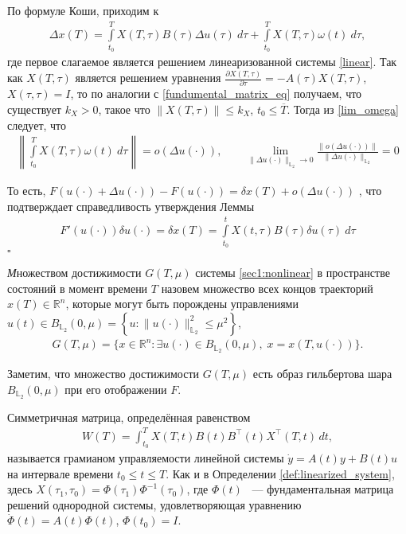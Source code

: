 \documentclass[../main.tex]{subfiles}
\begin{document}
	По формуле Коши, приходим к 
	\begin{gather*}
		\Delta x(T) = \int\limits_{t_0}^{T} X(T, \tau) B(\tau) \Delta u(\tau) \ d\tau + \int\limits_{t_0}^{T}  X(T, \tau) \omega(t) \ d\tau,
	\end{gather*}
	где первое слагаемое является решением линеаризованной системы \eqref{linear}.
	Так как $X(T, \tau) $ является решением уравнения $\frac{\partial X(T, \tau) }{\partial \tau} = -A(\tau)X(T, \tau)$, $X(\tau, \tau) = I$, то по аналогии с \eqref{fundumental_matrix_eq}  получаем, что существует $k_X > 0$, такое что $\|X(T, \tau) \| \leqslant k_X$, $t_0 \leqslant \overline{T} $. Тогда из \eqref{lim_omega} следует, что 
	\begin{gather*}
		\left\|\int\limits_{t_0}^{T}  X(T, \tau) \omega(t) \ d\tau  \right\| = o(\Delta u(\cdot)), \qquad \lim\limits_{\|\Delta u(\cdot) \|_{\mathbb{L}_2} \to 0}  \frac{ \| o(\Delta u(\cdot)) \| }{\|\Delta u(\cdot) \|_{\mathbb{L}_2}}  = 0
	\end{gather*}
	
	То есть, $F(u(\cdot) + \Delta u(\cdot)) - F(u(\cdot)) = \delta x(T) + o(\Delta u(\cdot))$ , что подтверждает справедливость утверждения Леммы
	\begin{gather}\label{lem2_assert}
		  F'(u(\cdot))\delta u(\cdot) =\delta x(T) = \int\limits_{t_0}^{t} X(t, \tau) B(\tau) \delta u(\tau) \ d\tau
	\end{gather}
	\hfill $\square$
	
	\begin{definition}
		{\textit  Множеством достижимости} $ G(T,\mu) $ системы \eqref{sec1:nonlinear} в пространстве состояний в момент времени $ T $ назовем множество всех концов траекторий $ x(T) \in \mathbb{R}^n $,  которые могут быть порождены управлениями	$ u(t) \in B_{\mathbb{L}_2}(0,\mu) =\left\lbrace u:\lVert u(\cdot)\rVert^2_{\mathbb{L}_2} \leqslant \mu^2\right\rbrace  $,
		\begin{gather*}
			G(T,\mu)=\{x\in \mathbb{R}^n:\exists u(\cdot)\in B_{\mathbb{L}_2}(0,\mu),\; x=x(T,u(\cdot))\}.
		\end{gather*}
	\end{definition}
	
	Заметим, что множество достижимости $G(T,\mu)$ есть образ гильбертова шара $B_{\mathbb{L}_2}(0,\mu)$ при его отображении $F$.
	
	\begin{definition}\label{def:Grammian}
		Симметричная матрица, определённая равенством
		\begin{gather*}
			W(T) = \int_{t_0}^{T}X(T,t)B(t)B^{\top}(t)X^{\top}(T,t) \, dt,
		\end{gather*}
		называется грамианом управляемости линейной системы $\dot{y} = A(t) y + B(t) u $ на интервале времени $  t_0 \leqslant t \leqslant T $. Как и в Определении \ref{def:linearized_system}, здесь $ X(\tau_1,\tau_0)= \Phi(\tau_1) \Phi^{-1}(\tau_0) $, где $\Phi(t) $ ~--- фундаментальная матрица решений однородной системы, удовлетворяющая уравнению $ \dot{\Phi}(t) = A(t) \Phi(t)$, $ \Phi(t_0) = I $.
	\end{definition}
	
\end{document}
